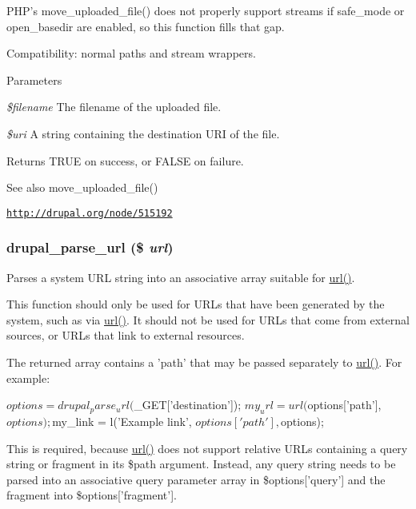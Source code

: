 PHP's move\_\-uploaded\_\-file() does not properly support streams if safe\_\-mode or open\_\-basedir are enabled, so this function fills that gap.

Compatibility: normal paths and stream wrappers.


\begin{DoxyParams}{Parameters}
\item[{\em \$filename}]The filename of the uploaded file. \item[{\em \$uri}]A string containing the destination URI of the file.\end{DoxyParams}
\begin{DoxyReturn}{Returns}
TRUE on success, or FALSE on failure.
\end{DoxyReturn}
\begin{DoxySeeAlso}{See also}
move\_\-uploaded\_\-file() 

\href{http://drupal.org/node/515192}{\tt http://drupal.org/node/515192} 
\end{DoxySeeAlso}
\hypertarget{group__php__wrappers_ga77e7930986edc614b20850a0a281609d}{
\subsubsection[{drupal\_\-parse\_\-url}]{\setlength{\rightskip}{0pt plus 5cm}drupal\_\-parse\_\-url (\$ {\em url})}}
\label{group__php__wrappers_ga77e7930986edc614b20850a0a281609d}
Parses a system URL string into an associative array suitable for \hyperlink{common_8inc_a43b2a0594431556db49df980801d8807}{url()}.

This function should only be used for URLs that have been generated by the system, such as via \hyperlink{common_8inc_a43b2a0594431556db49df980801d8807}{url()}. It should not be used for URLs that come from external sources, or URLs that link to external resources.

The returned array contains a 'path' that may be passed separately to \hyperlink{common_8inc_a43b2a0594431556db49df980801d8807}{url()}. For example: 
\begin{DoxyCode}
   $options = drupal_parse_url($_GET['destination']);
   $my_url = url($options['path'], $options);
   $my_link = l('Example link', $options['path'], $options);
\end{DoxyCode}


This is required, because \hyperlink{common_8inc_a43b2a0594431556db49df980801d8807}{url()} does not support relative URLs containing a query string or fragment in its \$path argument. Instead, any query string needs to be parsed into an associative query parameter array in \$options\mbox{[}'query'\mbox{]} and the fragment into \$options\mbox{[}'fragment'\mbox{]}.


